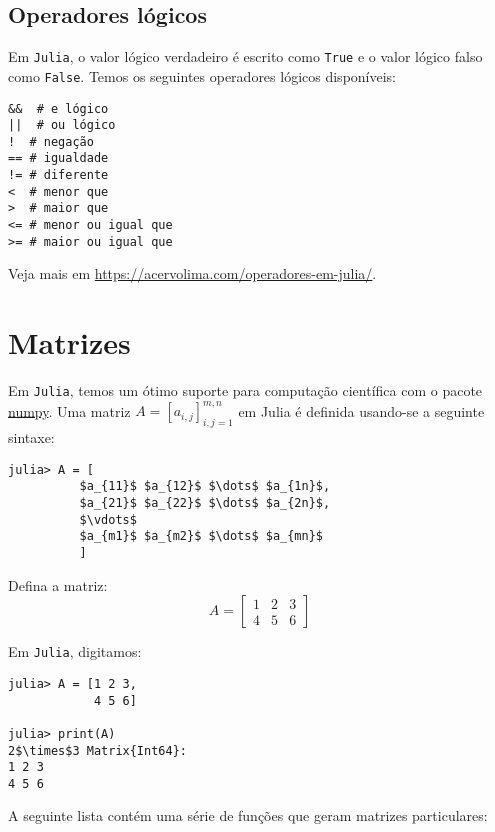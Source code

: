 \subsection{Operadores lógicos}

Em \verb+Julia+, o valor lógico verdadeiro é escrito como \verb+True+ e o valor lógico falso como \verb+False+. Temos os seguintes operadores lógicos disponíveis:
\begin{lstlisting}
&&  # e lógico
||  # ou lógico
!  # negação
== # igualdade
!= # diferente
<  # menor que
>  # maior que
<= # menor ou igual que
>= # maior ou igual que
\end{lstlisting}

Veja mais em \url{https://acervolima.com/operadores-em-julia/}.

\section{Matrizes}

Em \verb+Julia+, temos um ótimo suporte para computação científica com o pacote \href{http://www.numpy.org/}{numpy}. Uma matriz $A = [a_{i,j}]_{i,j=1}^{m,n}$ em Julia é definida usando-se a seguinte sintaxe:
\begin{lstlisting}[mathescape=true]
julia> A = [
          $a_{11}$ $a_{12}$ $\dots$ $a_{1n}$,
          $a_{21}$ $a_{22}$ $\dots$ $a_{2n}$,
          $\vdots$
          $a_{m1}$ $a_{m2}$ $\dots$ $a_{mn}$
          ]
\end{lstlisting}

\begin{ex}
  Defina a matriz:
  \begin{equation}
    A = \left[
      \begin{array}{ccc}
        1 & 2 & 3\\
        4 & 5 & 6
      \end{array}
\right]
  \end{equation}
\end{ex}
\begin{sol}
  Em \verb+Julia+, digitamos:
\begin{lstlisting}[mathescape=true]
julia> A = [1 2 3,
            4 5 6]

julia> print(A)
2$\times$3 Matrix{Int64}:
1 2 3
4 5 6
\end{lstlisting}
\end{sol}

A seguinte lista contém uma série de funções que geram matrizes particulares:

